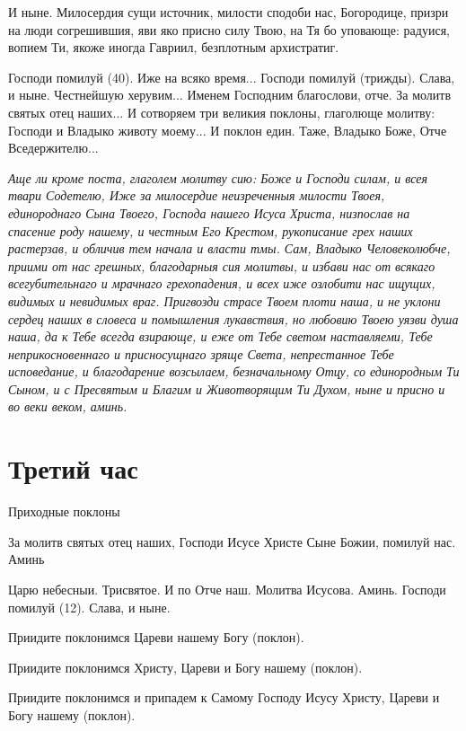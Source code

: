 И ныне. Милосердия сущи источник, милости сподоби нас, Богородице, призри на люди согрешившия, яви яко присно силу Твою, на Тя бо уповающе: радуися, вопием Ти, якоже иногда Гавриил, безплотным архистратиг. 

Господи помилуй (40). Иже на всяко время... Господи помилуй (трижды). Слава, и ныне. Честнейшую херувим... Именем Господним благослови, отче. За молитв святых отец наших... И сотворяем три великия поклоны, глаголюще молитву: Господи и Владыко животу моему... И поклон един. Таже, Владыко Боже, Отче Вседержителю... 

\itshape Аще ли кроме поста, глаголем молитву сию:\normalfont{} Боже и Господи силам, и всея твари Содетелю, Иже за милосердие неизреченныя милости Твоея, единороднаго Сына Твоего, Господа нашего Исуса Христа, низпослав на спасение роду нашему, и честным Его Крестом, рукописание грех наших растерзав, и обличив тем начала и власти тмы. Сам, Владыко Человеколюбче, приими от нас грешных, благодарныя сия молитвы, и избави нас от всякаго всегубительнаго и мрачнаго грехопадения, и всех иже озлобити нас ищущих, видимых и невидимых враг. Пригвозди страсе Твоем плоти наша, и не уклони сердец наших в словеса и помышления лукавствия, но любовию Твоею уязви душа наша, да к Тебе всегда взирающе, и еже от Тебе светом наставляеми, Тебе неприкосновеннаго и присносущнаго зряще Света, непрестанное Тебе исповедание, и благодарение возсылаем, безначальному Отцу, со единородным Ти Сыном, и с Пресвятым и Благим и Животворящим Ти Духом, ныне и присно и во веки веком, аминь.


\section{Третий час}
 


Приходные поклоны 

За молитв святых отец наших, Господи Исусе Христе Сыне Божии, помилуй нас. Аминь 

Царю небесныи. Трисвятое. И по Отче наш. Молитва Исусова. Аминь. Господи помилуй (12). Слава, и ныне. 

Приидите поклонимся Цареви нашему Богу (поклон).

Приидите поклонимся Христу, Цареви и Богу нашему (поклон).

Приидите поклонимся и припадем к Самому Господу Исусу Христу, Цареви и Богу нашему (поклон).


\medskip


